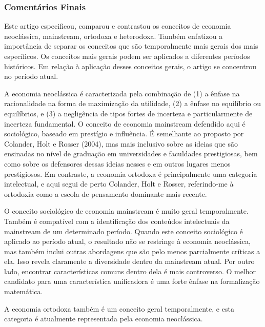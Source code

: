 \documentclass[12pt]{article}
\begin{document}
\subsubsection{\textbf{Comentários Finais}}

Este artigo especificou, comparou e contrastou os conceitos de economia neoclássica, mainstream, ortodoxa e heterodoxa. Também enfatizou a importância de separar os conceitos que são temporalmente mais gerais dos mais específicos. Os conceitos mais gerais podem ser aplicados a diferentes períodos históricos. Em relação à aplicação desses conceitos gerais, o artigo se concentrou no período atual.

A economia neoclássica é caracterizada pela combinação de (1) a ênfase na racionalidade na forma de maximização da utilidade, (2) a ênfase no equilíbrio ou equilíbrios, e (3) a negligência de tipos fortes de incerteza e particularmente de incerteza fundamental. O conceito de economia mainstream defendido aqui é sociológico, baseado em prestígio e influência. É semelhante ao proposto por Colander, Holt e Rosser (2004), mas mais inclusivo sobre as ideias que são ensinadas no nível de graduação em universidades e faculdades prestigiosas, bem como sobre os defensores dessas ideias nesses e em outros lugares menos prestigiosos. Em contraste, a economia ortodoxa é principalmente uma categoria intelectual, e aqui segui de perto Colander, Holt e Rosser, referindo-me à ortodoxia como a escola de pensamento dominante mais recente.

O conceito sociológico de economia mainstream é muito geral temporalmente. Também é compatível com a identificação dos conteúdos intelectuais da mainstream de um determinado período. Quando este conceito sociológico é aplicado ao período atual, o resultado não se restringe à economia neoclássica, mas também inclui outras abordagens que são pelo menos parcialmente críticas a ela. Isso revela claramente a diversidade dentro da mainstream atual. Por outro lado, encontrar características comuns dentro dela é mais controverso. O melhor candidato para uma característica unificadora é uma forte ênfase na formalização matemática.

A economia ortodoxa também é um conceito geral temporalmente, e esta categoria é atualmente representada pela economia neoclássica.
\end{document}
